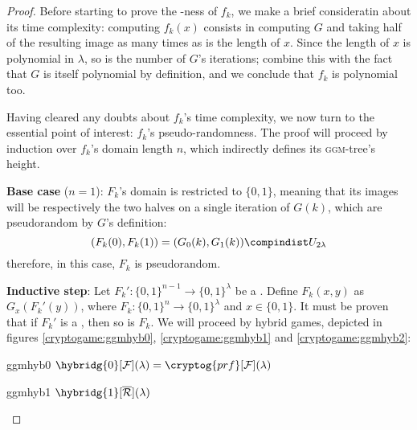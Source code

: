 \begin{proof}

    Before starting to prove the \prf-ness of $f_k$, we make a brief consideratin about its time complexity: computing $f_k(x)$ consists in computing $G$ and taking half of the resulting image as many times as is the length of $x$. Since the length of $x$ is polynomial in $\lambda$, so is the number of $G$'s iterations; combine this with the fact that $G$ is itself polynomial by definition, and we conclude that $f_k$ is polynomial too.

    Having cleared any doubts about $f_k$'s time complexity, we now turn to the essential point of interest: $f_k$'s pseudo-randomness. The proof will proceed by induction over $f_k$'s domain length $n$, which indirectly defines its \textsc{ggm}-tree's height.
    
    \textbf{Base case} ($n=1$): $F_k$'s domain is restricted to $\{0, 1\}$, meaning that its images will be respectively the two halves on a single iteration of $G(k)$, which are pseudorandom by $G$'s definition:
    \[
        (F_k(0), F_k(1))=(G_0(k), G_1(k)) \compindist U_{2\lambda}
    \]
    therefore, in this case, $F_k$ is pseudorandom.

    \textbf{Inductive step}: Let $F_k' : \{0, 1\}^{n-1} \to \{0, 1\}^\lambda$ be a \prf. Define $F_k(x,y)$ as $G_x(F_k'(y))$, where $F_k : \{0, 1\}^n \to \{0, 1\}^\lambda$ and $x \in \{0, 1\}$. It must be proven that if $F_k'$ is a \prf, then so is $F_k$. We will proceed by hybrid games, depicted in figures \ref{cryptogame:ggmhyb0}, \ref{cryptogame:ggmhyb1} and \ref{cryptogame:ggmhyb2}:

    \begin{cryptogame}
        {ggmhyb0}
        {$\hybridg{0}[\F](\lambda) = \cryptog{prf}[\F](\lambda)$}
        {}


    \end{cryptogame}

    \begin{cryptogame}
        {ggmhyb1}
        {$\hybridg{1}[\overline{\R}](\lambda)$}
        {}



\end{cryptogame}
\end{proof}
